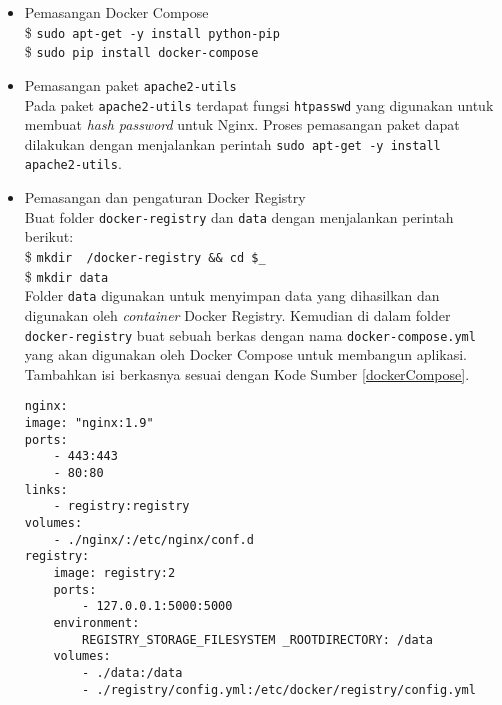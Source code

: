     \begin{itemize}
    \item Pemasangan Docker Compose\\
    \$ \texttt{sudo apt-get -y install python-pip} \\
    \$ \texttt{sudo pip install docker-compose}
    
    \item Pemasangan paket \texttt{apache2-utils}\\
    	Pada paket \texttt{apache2-utils} terdapat fungsi \texttt{htpasswd} yang digunakan untuk membuat \textit{hash password} untuk Nginx. Proses pemasangan paket dapat dilakukan dengan menjalankan perintah \texttt{sudo apt-get -y install apache2-utils}.
        
    \item Pemasangan dan pengaturan Docker Registry\\
    	Buat folder \texttt{docker-registry} dan \texttt{data} dengan menjalankan perintah berikut:\\
        \$ \texttt{mkdir ~/docker-registry \&\& cd \$\_} \\
        \$ \texttt{mkdir data} \\
        Folder \texttt{data} digunakan untuk menyimpan data yang dihasilkan dan digunakan oleh \textit{container} Docker Registry. Kemudian di dalam folder \texttt{docker-registry} buat sebuah berkas dengan nama \texttt{docker-compose.yml} yang akan digunakan oleh Docker Compose untuk membangun aplikasi. Tambahkan isi berkasnya sesuai dengan Kode Sumber \ref{dockerCompose}.
        
        \begin{lstlisting}[frame=single,tabsize=2,breaklines,caption={Isi Berkas docker-compose.yml},label=dockerCompose, captionpos=b]
nginx:
image: "nginx:1.9"
ports:
	- 443:443
	- 80:80
links:
	- registry:registry
volumes:
	- ./nginx/:/etc/nginx/conf.d
registry:
	image: registry:2
	ports:
		- 127.0.0.1:5000:5000
	environment:
		REGISTRY_STORAGE_FILESYSTEM _ROOTDIRECTORY: /data
	volumes:
		- ./data:/data
		- ./registry/config.yml:/etc/docker/registry/config.yml
		\end{lstlisting}
	

\end{itemize}
